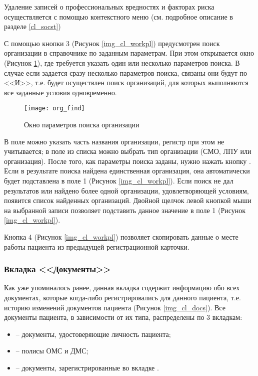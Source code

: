 Удаление записей о профессиональных вредностях и факторах риска осуществляется с помощью контекстного меню (см. подробное описание в разделе \ref{cl_socst})

С помощью кнопки 3 (Рисунок \ref{img_cl_workpl}) предусмотрен поиск организации в справочнике по заданным параметрам. При этом открывается окно (Рисунок \ref{img_cl_org_find}), где требуется указать один или несколько параметров поиска. В случае если задается сразу несколько параметров поиска, связаны они будут по <<И>>, т.е. будет осуществлен поиск организаций, для которых выполняются все заданные условия одновременно.

\begin{figure}[ht]\centering
 \texttt{[image: org\_find]}
 \caption{Окно параметров поиска организации}
 \label{img_cl_org_find}
\end{figure} 

В поле  можно указать часть названия организации, регистр при этом не учитывается; в поле  из списка можно выбрать тип организации (СМО, ЛПУ или организация). После того, как параметры поиска заданы, нужно нажать кнопку  . Если в результате поиска найдена единственная организация, она автоматически будет подставлена в поле 1 (Рисунок \ref{img_cl_workpl}). Если поиск не дал результатов или найдено более одной организации, удовлетворяющей условиям, появится список найденных организаций. Двойной щелчок левой кнопкой мыши на выбранной записи позволяет подставить данное значение в поле 1 (Рисунок \ref{img_cl_workpl}).

\begin{prim}
 Кнопка 4 (Рисунок \ref{img_cl_workpl}) позволяет скопировать данные о месте работы пациента из предыдущей регистрационной карточки.
\end{prim}

\subsubsection{Вкладка <<Документы>>} \label{cl_docs}

Как уже упоминалось ранее, данная вкладка содержит информацию обо всех документах, которые когда-либо регистрировались для данного пациента, т.е. историю изменений документов пациента (Рисунок \ref{img_cl_docs}). Все документы пациента, в зависимости от их типа, распределены по 3 вкладкам:
\begin{itemize}
 \item {} – документы, удостоверяющие личность пациента;
 \item	{} – полисы ОМС и ДМС;
 \item	{} – документы, зарегистрированные во вкладке .
\end{itemize}

